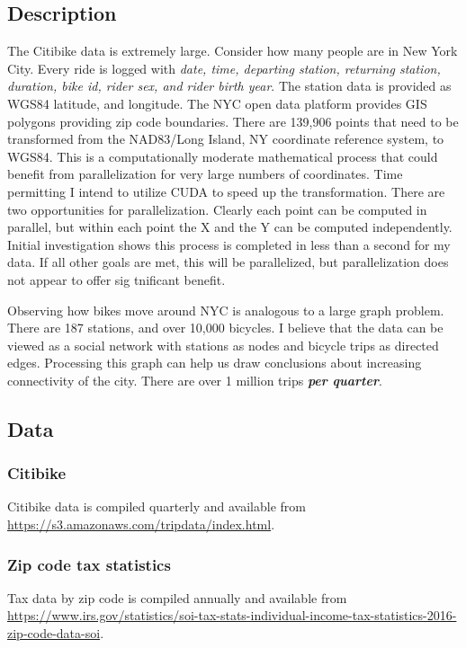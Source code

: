 \documentclass{article}
\begin{document}
\subsection{Description}
The Citibike data is extremely large. Consider how many people are in New York City. Every ride is logged with \textit{date, time, departing station, returning station, duration, bike id, rider sex, and rider birth year}. The station data is provided as WGS84 latitude, and longitude. The NYC open data platform provides GIS polygons providing zip code boundaries. There are 139,906 points that need to be transformed from the NAD83/Long Island, NY coordinate reference system, to WGS84. This is a computationally moderate mathematical process that could benefit from parallelization for very large numbers of coordinates. Time permitting I intend to utilize CUDA to speed up the transformation. There are two opportunities for parallelization. Clearly each point can be computed in parallel, but within each point the X and the Y can be computed independently. Initial investigation shows this process is completed in less than a second for my data. If all other goals are met, this will be parallelized, but parallelization does not appear to offer sig tnificant benefit.\par
Observing how bikes move around NYC is analogous to a large graph problem. There are 187 stations, and over 10,000 bicycles. I believe that the data can be viewed as a social network with stations as nodes and bicycle trips as directed edges. Processing this graph can help us draw conclusions about increasing connectivity of the city. There are over 1 million trips \textbf{\textit{per quarter}}.

\subsection{Data}
\subsubsection{Citibike}
Citibike data is compiled quarterly and available from \url{https://s3.amazonaws.com/tripdata/index.html}. 

\subsubsection{Zip code tax statistics}
Tax data by zip code is compiled annually and available from \url{https://www.irs.gov/statistics/soi-tax-stats-individual-income-tax-statistics-2016-zip-code-data-soi}.
\end{document}
